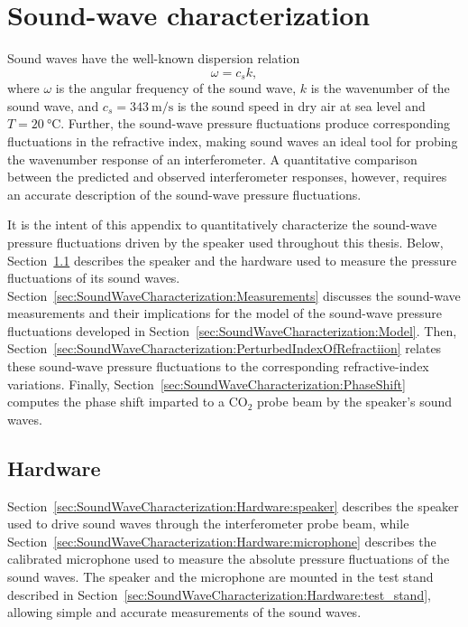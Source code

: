 \chapter{Sound-wave characterization}
\label{app:SoundWaveCharacterization}
Sound waves have the well-known dispersion relation
\begin{equation}
  \omega = c_s k,
  \label{eq:SoundWaveCharacterization:sound_wave_dispersion_relation}
\end{equation}
where
$\omega$ is the angular frequency of the sound wave,
$k$ is the wavenumber of the sound wave, and
$c_s = \SI{343}{\meter\per\second}$ is the sound speed
in dry air at sea level and $T = \SI{20}{\celsius}$.
Further, the sound-wave pressure fluctuations
produce corresponding fluctuations in the refractive index,
making sound waves an ideal tool
for probing the wavenumber response of an interferometer.
A quantitative comparison between
the predicted and observed interferometer responses, however,
requires an accurate description of the sound-wave pressure fluctuations.

It is the intent of this appendix
to quantitatively characterize the sound-wave pressure fluctuations
driven by the speaker used throughout this thesis.
Below, Section~\ref{sec:SoundWaveCharacterization:Hardware}
describes the speaker and
the hardware used to measure the pressure fluctuations of its sound waves.
Section~\ref{sec:SoundWaveCharacterization:Measurements}
discusses the sound-wave measurements and their implications
for the model of the sound-wave pressure fluctuations
developed in Section~\ref{sec:SoundWaveCharacterization:Model}.
Then, Section~\ref{sec:SoundWaveCharacterization:PerturbedIndexOfRefractiion}
relates these sound-wave pressure fluctuations to
the corresponding refractive-index variations.
Finally, Section~\ref{sec:SoundWaveCharacterization:PhaseShift}
computes the phase shift imparted to a CO$_2$ probe beam
by the speaker's sound waves.


\section{Hardware}
\label{sec:SoundWaveCharacterization:Hardware}
Section~\ref{sec:SoundWaveCharacterization:Hardware:speaker}
describes the speaker used to drive sound waves
through the interferometer probe beam, while
Section~\ref{sec:SoundWaveCharacterization:Hardware:microphone}
describes the calibrated microphone
used to measure the absolute pressure fluctuations of the sound waves.
The speaker and the microphone are mounted in the test stand described in
Section~\ref{sec:SoundWaveCharacterization:Hardware:test_stand},
allowing simple and accurate measurements of the sound waves.


